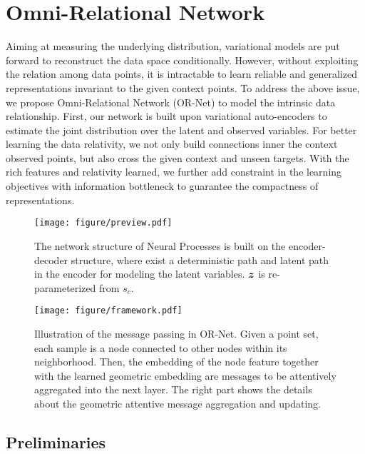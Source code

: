 \documentclass[sigconf]{acmart} %
\begin{document}
\section{Omni-Relational Network}\label{ss_OR-Net}

Aiming at measuring the underlying distribution, variational models are put forward to reconstruct the data space conditionally. However, without exploiting the relation among data points, it is intractable to learn reliable and generalized representations invariant to the given context points. 
To address the above issue, we propose Omni-Relational Network (OR-Net) to model the intrinsic data relationship. First, our network is built upon variational auto-encoders to estimate the joint distribution over the latent and observed variables. For better learning the data relativity, we not only build connections inner the context observed points, but also cross the given context and unseen targets. 
With the rich features and relativity learned, we further add constraint in the learning objectives with information bottleneck to guarantee the compactness of representations.

\begin{figure}[t]
  \centering
  \texttt{[image: figure/preview.pdf]}
  \caption{
     The network structure of Neural Processes is built on the encoder-decoder structure, where exist a deterministic path and latent path in the encoder for modeling the latent variables. ${\bm{z}}$ is re-parameterized from $s_c$. 
  }
  \label{fig:framework1}
\end{figure}

\begin{figure*}[t]
  \centering
  \texttt{[image: figure/framework.pdf]}
  \caption{
     Illustration of the message passing in OR-Net. Given a point set, each sample is a node connected to other nodes within its neighborhood. Then, the embedding of the node feature together with the learned geometric embedding are messages to be attentively aggregated into the next layer. The right part shows the details about the geometric attentive message aggregation and updating. 
  }
  \label{fig:framework2}
\end{figure*}




\subsection{Preliminaries}
\end{document}

